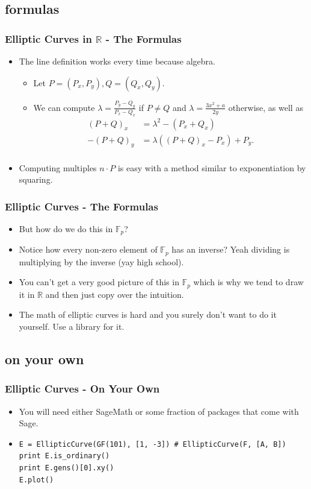 \documentclass[aspectratio=169,t]{beamer}
\newcommand{\RR}{\mathbb{R}}
\newcommand{\FF}{\mathbb{F}}
\begin{document}
\subsection{formulas}
\begin{frame}
\frametitle{Elliptic Curves in $\mathbb{R}$ - The Formulas}
\begin{itemize}
\item
The line definition works every time because algebra. \pause
\begin{itemize}
\item
Let $P = (P_x, P_y), Q = (Q_x, Q_y)$.
\item
We can compute $\lambda = \frac{P_y - Q_y}{P_x - Q_x}$ if $P \neq Q$ and
$\lambda = \frac{3x^2 + a}{2y}$ otherwise, as well as
\[ \begin{aligned}
(P + Q)_x &= \lambda^2 - (P_x + Q_x) \\
-(P + Q)_y &= \lambda ((P + Q)_x - P_x) + P_y. \\
\end{aligned} \]
\pause
\end{itemize}
\item
Computing multiples $n \cdot P$ is easy with a method similar to exponentiation
by squaring.
\end{itemize}
\end{frame}

\begin{frame}
\frametitle{Elliptic Curves - The Formulas}
\begin{itemize}
\item
But how do we do this in $\FF_p$? \pause
\item
Notice how every non-zero element of $\FF_p$ has an inverse? Yeah dividing is
multiplying by the inverse (yay high school).
\item
You can't get a very good picture of this in $\FF_p$ which is why we tend to
draw it in $\RR$ and then just copy over the intuition.
\item
The math of elliptic curves is hard and you surely don't want to do it yourself.
Use a library for it.
\end{itemize}
\end{frame}

\subsection{on your own}
\begin{frame}[fragile]
\frametitle{Elliptic Curves - On Your Own}
\begin{itemize}
\item
You will need either SageMath or some fraction of packages that come with Sage.
\item
\begin{lstlisting}
E = EllipticCurve(GF(101), [1, -3]) # EllipticCurve(F, [A, B])
print E.is_ordinary()
print E.gens()[0].xy()
E.plot()
\end{lstlisting}
\end{itemize}
\end{frame}
\end{document}
